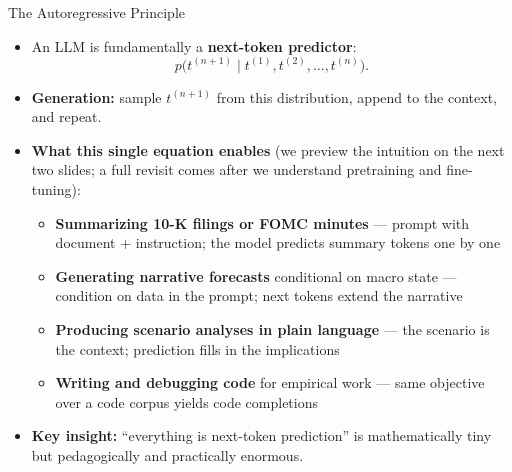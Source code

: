 \documentclass[10pt,english,aspectratio=169]{beamer}
\begin{document}
\begin{frame}{The Autoregressive Principle}
\begin{itemize}
\item An LLM is fundamentally a \textbf{next-token predictor}:
\[
   p\bigl(t^{(n+1)} \mid t^{(1)}, t^{(2)}, \ldots, t^{(n)}\bigr).
\]

\medskip
\item \textbf{Generation:} sample $t^{(n+1)}$ from this distribution, append to the context, and repeat.

\medskip
\item \textbf{What this single equation enables} (we preview the intuition on the next two slides; a full revisit comes after we understand pretraining and fine-tuning):
\begin{itemize}
    \item \textbf{Summarizing 10-K filings or FOMC minutes} --- prompt with document + instruction; the model predicts summary tokens one by one
    \item \textbf{Generating narrative forecasts} conditional on macro state --- condition on data in the prompt; next tokens extend the narrative
    \item \textbf{Producing scenario analyses in plain language} --- the scenario is the context; prediction fills in the implications
    \item \textbf{Writing and debugging code} for empirical work --- same objective over a code corpus yields code completions
\end{itemize}

\medskip
\item \textbf{Key insight:} ``everything is next-token prediction'' is mathematically tiny but pedagogically and practically enormous.
\end{itemize}
\end{frame}
\end{document}
